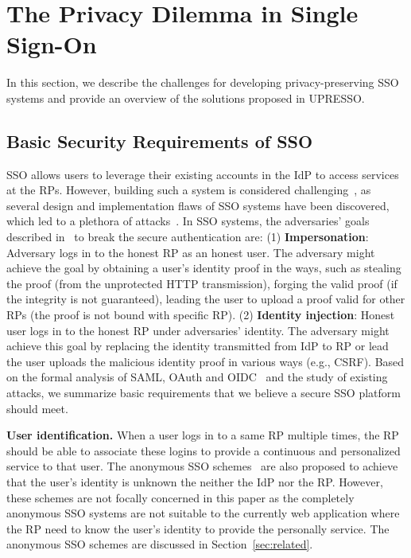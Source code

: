 \section{The Privacy Dilemma in Single Sign-On}
\label{sec:challenge}

In this section, we describe the challenges for developing privacy-preserving SSO systems and provide an overview of the solutions proposed in UPRESSO.



\subsection{Basic Security Requirements of SSO}
\label{subsec:basicrequirements}

SSO allows users to leverage their existing accounts in the IdP to access services at the RPs.
However, building such a system is considered challenging~\cite{SPRESSO}, as several design and implementation flaws of SSO systems have been discovered, which led to a plethora of attacks~\cite{SomorovskyMSKJ12,WangCW12,ArmandoCCCPS13,ZhouE14,WangZLLYLG15,WangZLG16,YangLLZH16,MainkaMS16,MohsenS16,MainkaMSW17,YangLCZ18,YangLS17,ShiWL19}.
In SSO systems, the adversaries' goals described in~\cite{SPRESSO} to break the secure authentication are:
(1) \textbf{Impersonation}: Adversary logs in to the honest RP as an honest user. The adversary might achieve the goal by obtaining a user's identity proof in the ways, such as stealing the proof (from the unprotected HTTP transmission), forging the valid proof (if the integrity is not guaranteed), leading the user to upload a proof valid for other RPs (the proof is not bound with specific RP).
(2) \textbf{Identity injection}: Honest user logs in to the honest RP under adversaries' identity. The adversary might achieve this goal by replacing the identity transmitted from IdP to RP or lead the user uploads the malicious identity proof in various ways (e.g., CSRF).
Based on the formal analysis of SAML, OAuth and OIDC~\cite{ArmandoCCCT08,FettKS16, FettKS17} and the study of existing attacks, we summarize basic requirements that we believe a secure SSO platform should meet.


\vspace{1mm}\noindent\textbf{User identification.} When a user logs in to a same RP multiple times, the RP should be able to associate these logins to provide a continuous and personalized service to that user. The anonymous SSO schemes~\cite{ElmuftiWRR08,WangWS13,HanCSTW18} are also proposed to achieve that the user's identity is unknown the neither the IdP nor the RP. However, these schemes are not focally concerned in this paper as the completely anonymous SSO systems are not suitable to the currently web application where the RP need to know the user's identity to provide the personally service. The anonymous SSO schemes are discussed in Section~\ref{sec:related}.

